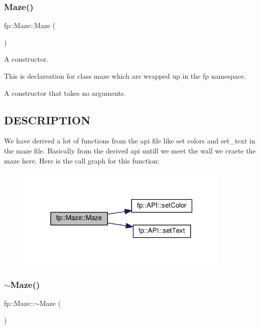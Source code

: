 \subsubsection{\texorpdfstring{Maze()}{Maze()}}
{\footnotesize\ttfamily fp\+::\+Maze\+::\+Maze (\begin{DoxyParamCaption}{ }\end{DoxyParamCaption})}



A constructor. 

This is declareation for class maze which are wrapped up in the fp namespace.

A constructor that takes no arguments.\hypertarget{_m_a_z_e_8h_DESCRIPTION}{}\subsection{D\+E\+S\+C\+R\+I\+P\+T\+I\+ON}\label{_m_a_z_e_8h_DESCRIPTION}
We have derived a lot of functions from the api file like set colors and set\+\_\+text in the maze file. Basically from the derived api untill we meet the wall we craete the maze here. Here is the call graph for this function\+:
\nopagebreak
\begin{figure}[H]
\begin{center}
\leavevmode
\includegraphics[width=291pt]{classfp_1_1_maze_af090b97595ed34cad9f7c8de9e79a127_cgraph}
\end{center}
\end{figure}
\mbox{\label{classfp_1_1_maze_ae5f5b10dd66d6a994a40da62fef39577}} 
\subsubsection{\texorpdfstring{$\sim$\+Maze()}{~Maze()}}
{\footnotesize\ttfamily fp\+::\+Maze\+::$\sim$\+Maze (\begin{DoxyParamCaption}{ }\end{DoxyParamCaption})\hspace{0.3cm}{\ttfamily [inline]}}



